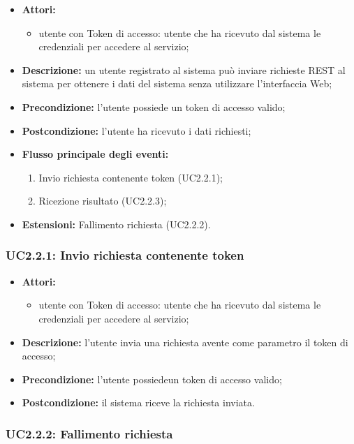 \begin{itemize}
	\item \textbf{Attori:}
	\begin{itemize}
		\item utente con Token di accesso: utente che ha ricevuto dal sistema le credenziali per accedere al servizio;
	\end{itemize}
	\item \textbf{Descrizione:} un utente registrato al sistema può inviare richieste REST al sistema per ottenere i dati del sistema senza utilizzare l'interfaccia Web;
	\item \textbf{Precondizione:} l'utente possiede un token di accesso valido;
	\item \textbf{Postcondizione:} l'utente ha ricevuto i dati richiesti;
	\item \textbf{Flusso principale degli eventi:}
	\begin{enumerate}
		\item Invio richiesta contenente token (UC2.2.1);
		\item Ricezione risultato (UC2.2.3);
	\end{enumerate}
	\item \textbf{Estensioni:} Fallimento richiesta (UC2.2.2).
\end{itemize}


\subsubsection{UC2.2.1: Invio richiesta contenente token}

\begin{itemize}
	\item \textbf{Attori:}
	\begin{itemize}
		\item utente con Token di accesso: utente che ha ricevuto dal sistema le credenziali per accedere al servizio;
	\end{itemize}
	\item \textbf{Descrizione:} l'utente invia una richiesta avente come parametro il token di accesso;
	\item \textbf{Precondizione:} l'utente possiedeun token di accesso valido;
	\item \textbf{Postcondizione:} il sistema riceve la richiesta inviata.
\end{itemize}

\subsubsection{UC2.2.2: Fallimento richiesta}

